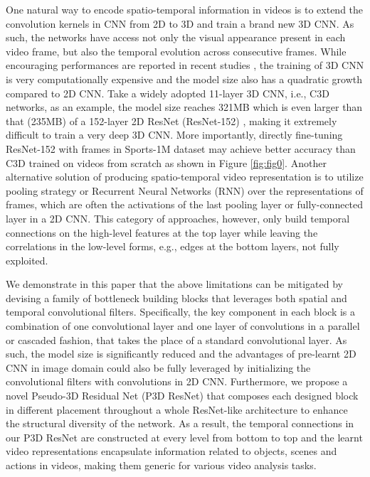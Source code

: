 \documentclass[10pt,twocolumn,letterpaper]{article}
\begin{document}
One natural way to encode spatio-temporal information in videos is to extend the convolution kernels in CNN from 2D to 3D and train a brand new 3D CNN. As such, the networks have access not only the visual appearance present in each video frame, but also the temporal evolution across consecutive frames. While encouraging performances are reported in recent studies \cite{Ji:PAMI13,tran2015learning,varol2016long}, the training of 3D CNN is very computationally expensive and the model size also has a quadratic growth compared to 2D CNN. Take a widely adopted 11-layer 3D CNN, i.e., C3D \cite{tran2015learning} networks, as an example, the model size reaches 321MB which is even larger than that (235MB) of a 152-layer 2D ResNet (ResNet-152) \cite{he2015deep}, making it extremely difficult to train a very deep 3D CNN. More importantly, directly fine-tuning ResNet-152 with frames in Sports-1M dataset \cite{karpathy2014large} may achieve better accuracy than C3D trained on videos from scratch as shown in Figure \ref{fig:fig0}. Another alternative solution of producing spatio-temporal video representation is to utilize pooling strategy or Recurrent Neural Networks (RNN) over the representations of frames, which are often the activations of the last pooling layer or fully-connected layer in a 2D CNN. This category of approaches, however, only build temporal connections on the high-level features at the top layer while leaving the correlations in the low-level forms, e.g., edges at the bottom layers, not fully exploited.


We demonstrate in this paper that the above limitations can be mitigated by devising a family of bottleneck building blocks that leverages both spatial and temporal convolutional filters. Specifically, the key component in each block is a combination of one  convolutional layer and one layer of  convolutions in a parallel or cascaded fashion, that takes the place of a standard  convolutional layer. As such, the model size is significantly reduced and the advantages of pre-learnt 2D CNN in image domain could also be fully leveraged by initializing the  convolutional filters with  convolutions in 2D CNN. Furthermore, we propose a novel Pseudo-3D Residual Net (P3D ResNet) that composes each designed block in different placement throughout a whole ResNet-like architecture to enhance the structural diversity of the network. As a result, the temporal connections in our P3D ResNet are constructed at every level from bottom to top and the learnt video representations encapsulate information related to objects, scenes and actions in videos, making them generic for various video analysis tasks.
\end{document}

